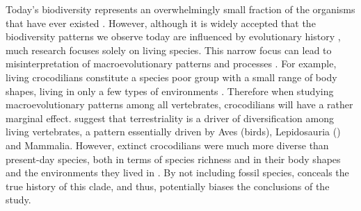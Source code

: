 Today's biodiversity represents an overwhelmingly small fraction of the organisms that have ever existed \citep{novacek1992ext,raup1993extinction}.
However, although it is widely accepted that the biodiversity patterns %
we observe today are influenced by evolutionary history \citep{fritzdiversity2013}
, much research focuses solely on living species.
This narrow focus can lead to misinterpretation of macroevolutionary patterns and processes \citep{benton2015}.
For example, living crocodilians constitute a species poor group \citep[25 species;][]{uetz2010original} with a small range of body shapes, living in only a few types of environments \citep[marine or freshwater;][]{Martin2008}.
Therefore when studying macroevolutionary patterns among all vertebrates, crocodilians will have a rather marginal effect. %
\cite{Wiens2015} suggest that terrestriality is a driver of diversification among living vertebrates, a pattern essentially driven by Aves (birds), Lepidosauria () and Mammalia. 
However, extinct crocodilians were much more diverse than present-day species, both in terms of species richness \citep[244 species are reported in][]{Bronzati2015} and in their body shapes and the environments they lived in \citep[extinct crocodilians included tree-dwelling species etc;][]{stubbs2013}. %
By not including fossil species, \cite{Wiens2015} conceals the true history of this clade, and thus, potentially biases the conclusions of the study.

